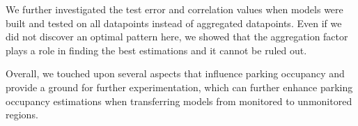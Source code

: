 	We further investigated the test error and correlation values when models were built and tested on all datapoints instead of aggregated datapoints. Even if we did not discover an optimal pattern here, we showed that the aggregation factor plays a role in finding the best estimations and it cannot be ruled out. 
	
	Overall, we touched upon several aspects that influence parking occupancy and provide a ground for further experimentation, which can further enhance parking occupancy estimations when transferring models from monitored to unmonitored regions.